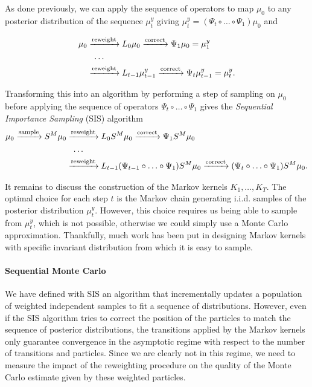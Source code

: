 As done previously, we can apply the sequence of operators to map $\mu_0$ to any posterior distribution of the sequence $\mu^y_t$ giving $\mu^y_t = (\Psi_t \circ \ldots \circ \Psi_1)\mu_0$ and

\begin{align*}
  \mu_0
  &\xrightarrow{\text{reweight}} L_0\mu_0 \xrightarrow{\text{correct}} \Psi_1\mu_0 = \mu^y_1\\
  &\ \ \ldots\\
  &\xrightarrow{\text{reweight}} L_{t-1}\mu^y_{t-1} \xrightarrow{\text{correct}} \Psi_t\mu^y_{t-1} = \mu^y_t.
\end{align*}

Transforming this into an algorithm by performing a step of sampling on $\mu_0$ before applying the sequence of operators $\Psi_t \circ \ldots \circ \Psi_1$ gives the \textit{Sequential Importance Sampling} (SIS) algorithm
\begin{align*}
  \mu_0 \xrightarrow{\text{sample}} S^M\mu_0
  &\xrightarrow{\text{reweight}} L_0S^M\mu_0 \xrightarrow{\text{correct}} \Psi_1S^M\mu_0\\
  &\ \ \ldots\\
  &\xrightarrow{\text{reweight}} L_{t-1}(\Psi_{t-1} \circ \ldots \circ \Psi_1)S^M\mu_0 \xrightarrow{\text{correct}} (\Psi_t \circ \ldots \circ \Psi_1)S^M\mu_0.
\end{align*}

It remains to discuss the construction of the Markov kernels $K_1, \ldots, K_T$. The optimal choice for each step $t$ is the Markov chain generating i.i.d. samples of the posterior distribution $\mu^y_t$. However, this choice requires us being able to sample from $\mu^y_t$, which is not possible, otherwise we could simply use a Monte Carlo approximation. Thankfully, much work has been put in designing Markov kernels with specific invariant distribution from which it is easy to sample.

\paragraph{Sequential Monte Carlo} We have defined with SIS an algorithm that incrementally updates a population of weighted independent samples to fit a sequence of distributions. However, even if the SIS algorithm tries to correct the position of the particles to match the sequence of posterior distributions, the transitions applied by the Markov kernels only guarantee convergence in the asymptotic regime with respect to the number of transitions and particles. Since we are clearly not in this regime, we need to measure the impact of the reweighting  procedure on the quality of the Monte Carlo estimate given by these weighted particles.

